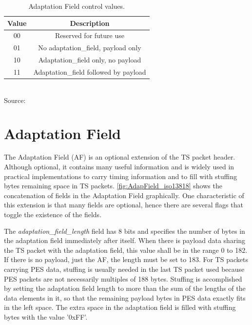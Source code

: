 \documentclass[
	12pt,				%
	openright,			%
	twoside,			%
	a4paper,			%
	brazil,
	french,				%
	english
	]{abntex2}
\begin{document}
\begin{table}[!hb]
\caption{Adaptation Field control values.}
\begin{center}
\begin{tabular}{|c|c|}
\hline
Value & Description \\
\hline
00 & Reserved for future use\\
\hline
01 & No adaptation\_field, payload only\\
\hline
10 & Adaptation\_field only, no payload\\
\hline
11 & Adaptation\_field followed by payload\\
\hline
\end{tabular}
\label{tab_adapataion_field}
\\Source: 
\end{center}
\end{table}

\section{Adaptation Field}

The Adaptation Field (AF) is an optional extension of the TS packet header. Although optional, it contains many useful information and is widely used in practical implementations to carry timing information and to fill with stuffing bytes remaining space in TS packets. \autoref{fig:AdapField_iso13818} shows the concatenation of fields in the Adaptation Field graphically. One characteristic of this extension is that many fields are optional, hence there are several flags that toggle the existence of the fields.

The \textit{adaptation\_field\_length} field has 8 bits and specifies the number of bytes in the adaptation field immediately after itself. When there is payload data sharing the TS packet with the adaptation field, this value shall be in the range 0 to 182. If there is no payload, just the AF, the length must be set to 183. For TS packets carrying PES data, stuffing is usually needed in the last TS packet used because PES packets are not necessarily multiples of 188 bytes. Stuffing is accomplished by setting the adaptation field length to more than the sum of the lengths of the data elements in it, so that the remaining payload bytes in PES data exactly fits in the left space. The extra space in the adaptation field is filled with stuffing bytes with the value '0xFF'.

\end{document}
